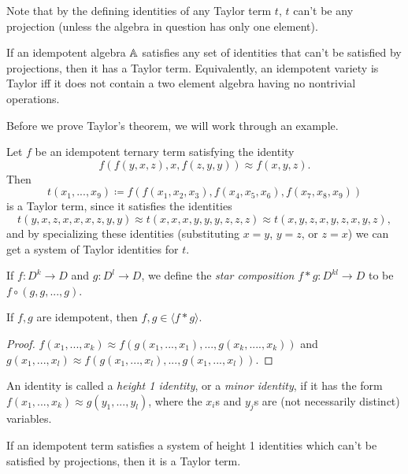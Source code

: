 \documentclass[letterpaper,11pt]{article}
\begin{document}
Note that by the defining identities of any Taylor term $t$, $t$ can't be any projection (unless the algebra in question has only one element).

\begin{thm} If an idempotent algebra $\mathbb{A}$ satisfies any set of identities that can't be satisfied by projections, then it has a Taylor term. Equivalently, an idempotent variety is Taylor iff it does not contain a two element algebra having no nontrivial operations.
\end{thm}

Before we prove Taylor's theorem, we will work through an example.

\begin{ex} Let $f$ be an idempotent ternary term satisfying the identity
\[
f(f(y,x,z),x,f(z,y,y)) \approx f(x,y,z).
\]
Then
\[
t(x_1, ..., x_9) \coloneqq f(f(x_1,x_2,x_3), f(x_4,x_5,x_6), f(x_7,x_8,x_9))
\]
is a Taylor term, since it satisfies the identities
\[
t(y,x,z,x,x,x,z,y,y) \approx t(x,x,x,y,y,y,z,z,z) \approx t(x,y,z,x,y,z,x,y,z),
\]
and by specializing these identities (substituting $x=y$, $y=z$, or $z=x$) we can get a system of Taylor identities for $t$.
\end{ex}

\begin{defn}\label{star-comp-defn} If $f : D^k \rightarrow D$ and $g : D^l \rightarrow D$, we define the \emph{star composition} $f * g : D^{kl} \rightarrow D$ to be $f\circ (g, g, ..., g)$.
\end{defn}

\begin{prop} If $f,g$ are idempotent, then $f,g \in \langle f*g \rangle$.
\end{prop}
\begin{proof} $f(x_1, ..., x_k) \approx f(g(x_1, ..., x_1), ..., g(x_k, ...., x_k))$ and $g(x_1, ..., x_l) \approx f(g(x_1, ..., x_l), ..., g(x_1, ..., x_l))$.
\end{proof}

\begin{defn} An identity is called a \emph{height 1 identity}, or a \emph{minor identity}, if it has the form $f(x_1, ..., x_k) \approx g(y_1, ..., y_l)$, where the $x_i$s and $y_j$s are (not necessarily distinct) variables.
\end{defn}

\begin{prop} If an idempotent term satisfies a system of height 1 identities which can't be satisfied by projections, then it is a Taylor term.
\end{prop}
\end{document}
